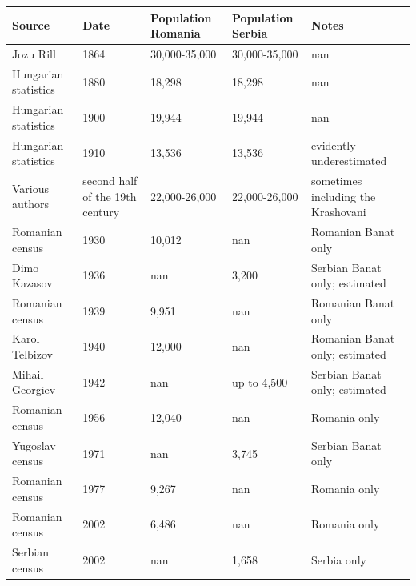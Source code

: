 \documentclass{article}
\begin{document}
\begin{tabular}{lllll}
\toprule
Source & Date & Population Romania & Population Serbia & Notes \\
\midrule
Jozu Rill & 1864 & 30,000-35,000 & 30,000-35,000 & nan \\
Hungarian statistics & 1880 & 18,298 & 18,298 & nan \\
Hungarian statistics & 1900 & 19,944 & 19,944 & nan \\
Hungarian statistics & 1910 & 13,536 & 13,536 & evidently underestimated \\
Various authors & second half of the 19th century & 22,000-26,000 & 22,000-26,000 & sometimes including the Krashovani \\
Romanian census & 1930 & 10,012 & nan & Romanian Banat only \\
Dimo Kazasov & 1936 & nan & 3,200 & Serbian Banat only; estimated \\
Romanian census & 1939 & 9,951 & nan & Romanian Banat only \\
Karol Telbizov & 1940 & 12,000 & nan & Romanian Banat only; estimated \\
Mihail Georgiev & 1942 & nan & up to 4,500 & Serbian Banat only; estimated \\
Romanian census & 1956 & 12,040 & nan & Romania only \\
Yugoslav census & 1971 & nan & 3,745 & Serbian Banat only \\
Romanian census & 1977 & 9,267 & nan & Romania only \\
Romanian census & 2002 & 6,486 & nan & Romania only \\
Serbian census & 2002 & nan & 1,658 & Serbia only \\
\bottomrule
\end{tabular}
\end{document}
